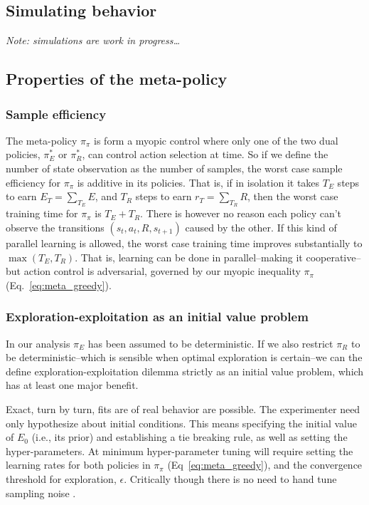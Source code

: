 \documentclass[9pt,twocolumn,twoside]{pnas-new}
\begin{document}
\subsection*{Simulating behavior}
\textit{Note: simulations are work in progress\ldots}


\subsection*{Properties of the meta-policy} 
\subsubsection*{Sample efficiency}
The meta-policy $\pi_{\pi}$ is form a myopic control where only one of the two dual policies, $\pi^*_E$ or $\pi^*_R$, can control action selection at time. So if we define the number of state observation as the number of samples, the worst case sample efficiency for $\pi_{\pi}$ is additive in its policies. That is, if in isolation it takes $T_E$ steps to earn $E_{T} = \sum_{T_E} E$, and $T_R$ steps to earn $r_{T} = \sum_{T_R} R$, then the worst case training time for $\pi_{\pi}$ is $T_E + T_R$. There is however no reason each policy can't observe the transitions $(s_t, a_t, R, s_{t+1})$ caused by the other. If this kind of parallel learning is allowed, the worst case training time improves substantially to $\max (T_E, T_R)$. That is, learning can be done in parallel--making it cooperative--but action control is adversarial, governed by our myopic inequality $\pi_{\pi}$ (Eq.~\ref{eq:meta_greedy}).

\subsubsection*{Exploration-exploitation as an initial value problem}
In our analysis $\pi_E$ has been assumed to be deterministic. If we also restrict $\pi_R$ to be deterministic--which is sensible when optimal exploration is certain--we can the define exploration-exploitation dilemma strictly as an initial value problem, which has at least one major benefit.

Exact, turn by turn, fits are of real behavior are possible. The experimenter need only hypothesize about initial conditions. This means specifying the initial value of $E_0$ (i.e., its prior) and establishing a tie breaking rule, as well as setting the hyper-parameters. At minimum hyper-parameter tuning will require setting the learning rates for both policies in $\pi_{\pi}$ (Eq~\ref{eq:meta_greedy}), and the convergence threshold for exploration, $\epsilon$. Critically though there is no need to hand tune sampling noise \cite{Sutton2018a}.
\end{document}
